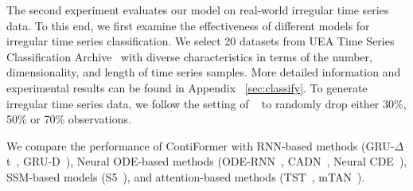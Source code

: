 \documentclass{article}
\begin{document}
The second experiment evaluates our model on real-world irregular time series data.
To this end, we first examine the effectiveness of different models for irregular time series classification. 
We select 20 datasets from UEA Time Series Classification Archive~\cite{bagnall2018uea} with diverse characteristics in terms of the number, dimensionality, and length of time series samples. 
More detailed information and experimental results can be found in Appendix ~\ref{sec:classify}. 
To generate irregular time series data, we follow the setting of ~\cite{kidger2020neural} to randomly drop either 30\%, 50\% or 70\% observations.

We compare the performance of ContiFormer with RNN-based methods (GRU-$\Delta$t~\cite{kidger2020neural}, GRU-D~\cite{che2018recurrent}), Neural ODE-based methods (ODE-RNN~\cite{rubanova2019latent}, CADN~\cite{chien2021continuous}, Neural CDE~\cite{kidger2020neural}), SSM-based models (S5~\cite{smith2022simplified}), and attention-based methods (TST~\cite{zerveas2021transformer}, mTAN~\cite{shukla2021multi}).
\end{document}
